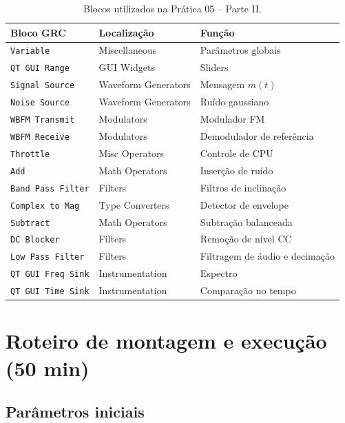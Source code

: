 \documentclass[11pt,a4paper]{article}
\begin{document}
\begin{table}[H]
  \centering
  \begin{tabular}{l l l}
    \toprule
    \textbf{Bloco GRC} & \textbf{Localização} & \textbf{Função} \\
    \midrule
    \texttt{Variable}          & Miscellaneous        & Parâmetros globais \\
    \texttt{QT GUI Range}      & GUI Widgets          & Sliders \\
    \texttt{Signal Source}     & Waveform Generators  & Mensagem $m(t)$ \\
    \texttt{Noise Source}      & Waveform Generators  & Ruído gaussiano \\
    \texttt{WBFM Transmit}     & Modulators           & Modulador FM \\
    \texttt{WBFM Receive}      & Modulators           & Demodulador de referência \\
    \texttt{Throttle}          & Misc Operators       & Controle de CPU \\
    \texttt{Add}               & Math Operators       & Inserção de ruído \\
    \texttt{Band Pass Filter}  & Filters              & Filtros de inclinação \\
    \texttt{Complex to Mag}    & Type Converters      & Detector de envelope \\
    \texttt{Subtract}          & Math Operators       & Subtração balanceada \\
    \texttt{DC Blocker}        & Filters              & Remoção de nível CC \\
    \texttt{Low Pass Filter}   & Filters              & Filtragem de áudio e decimação \\
    \texttt{QT GUI Freq Sink}  & Instrumentation      & Espectro \\
    \texttt{QT GUI Time Sink}  & Instrumentation      & Comparação no tempo \\
    \bottomrule
  \end{tabular}
  \caption{Blocos utilizados na Prática 05 -- Parte II.}
\end{table}

\section{Roteiro de montagem e execução (50 min)}

\subsection*{Parâmetros iniciais}
\end{document}
